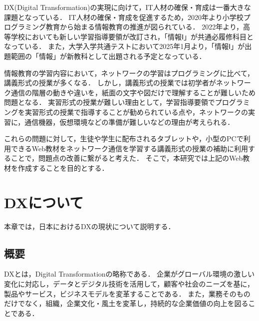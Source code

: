 \documentclass[12pt,a4j,titlepage]{ltjsarticle}
\begin{document}
DX(Digital Transformation)の実現に向けて，IT人材の確保・育成は一番大きな課題となっている．
IT人材の確保・育成を促進するため，2020年より小学校プログラミング教育から始まる情報教育の推進が図られている．
2022年より，高等学校においても新しい学習指導要領が改訂され，「情報Ⅰ」が共通必履修科目となっている．
また，大学入学共通テストにおいて2025年1月より，「情報Ⅰ」が出題範囲の「情報」が新教科として出題される予定となっている．

情報教育の学習内容において，ネットワークの学習はプログラミングに比べて，講義形式の授業が多くなる．
しかし，講義形式の授業では初学者がネットワーク通信の階層の動きや違いを，紙面の文字や図だけで理解することが難しいため問題となる．
実習形式の授業が難しい理由として，学習指導要領でプログラミングを実習形式の授業で指導することが勧められている点や，ネットワークの実習に，通信機器，仮想環境などの準備が難しいなどの理由が考えられる．

これらの問題に対して，生徒や学生に配布されるタブレットや，小型のPCで利用できるWeb教材をネットワーク通信を学習する講義形式の授業の補助に利用することで，問題点の改善に繋がると考えた．
そこで，本研究では上記のWeb教材を作成することを目的とする．
\clearpage

\section{DXについて}%
本章では，日本におけるDXの現状について説明する．
\subsection{概要}
DXとは，Digital Transformationの略称である．
企業がグローバル環境の激しい変化に対応し，データとデジタル技術を活用して，顧客や社会のニーズを基に，製品やサービス，ビジネスモデルを変革することである．
また，業務そのものだけでなく，組織，企業文化・風土を変革し，持続的な企業価値の向上を図ることである\cite{dx_gaiyou}． 
\end{document}
